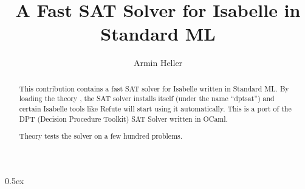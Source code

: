 \documentclass[11pt,a4paper]{article}
\begin{document}
\title{A Fast SAT Solver for Isabelle in Standard ML}
\author{Armin Heller}
\maketitle

\begin{abstract}
This contribution contains a fast SAT solver for Isabelle written in
Standard ML.  By loading the theory , the SAT solver
installs itself (under the name ``dptsat'') and certain Isabelle tools like
Refute will start using it automatically.
This is a port of the DPT (Decision Procedure Toolkit) SAT Solver written in
OCaml.

Theory  tests the solver on a few hundred problems.
\end{abstract}

\tableofcontents

\parindent 0pt\parskip 0.5ex





\end{document}
